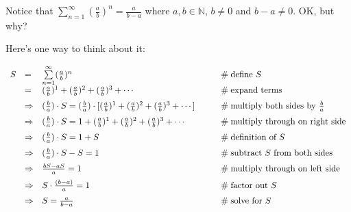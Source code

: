 \documentclass[11pt, oneside]{article}   	%
\begin{document}
\noindent
Notice that  $\sum\limits_{n = 1}^\infty (\frac{a}{b})^n  = \frac{a}{b - a}$ where $a,b \in \mathbb{N}$, $b \neq 0$ and $b - a \neq 0$. OK, but why?

\bigskip
\noindent
 Here's one way to think about it:  
      
\begin{equation*}
\begin{array}{lllll}
S
&=& \sum\limits_{n = 1}^\infty (\frac{a}{b})^n                                                                                                                &\qquad  \mathrel{\#} \text{define $S$}                                          \\ 
\vspace{2.0mm}
&=& (\frac{a}{b})^1 + (\frac{a}{b})^2 + (\frac{a}{b})^3 + \cdots                                                                                      &\qquad  \mathrel{\#} \text{expand terms}                                      \\
\vspace{2.0mm}
&\Rightarrow& (\frac{b}{a}) \cdot S = (\frac{b}{a}) \cdot [(\frac{a}{b})^1 + (\frac{a}{b})^2 + (\frac{a}{b})^3 + \cdots ]   &\qquad  \mathrel{\#} \text{multiply both sides by $\frac{b}{a}$}     \\
\vspace{2.0mm}
&\Rightarrow&  (\frac{b}{a}) \cdot S = 1 +(\frac{a}{b})^1 + (\frac{a}{b})^2 + (\frac{a}{b})^3 + \cdots                            &\qquad  \mathrel{\#} \text{multiply through on right side}              \\
\vspace{2.0mm}
&\Rightarrow&  (\frac{b}{a}) \cdot S = 1 + S                                                                                                                &\qquad  \mathrel{\#} \text{definition of $S$}                                   \\
\vspace{2.0mm}
&\Rightarrow&  (\frac{b}{a}) \cdot S - S = 1                                                                                                                 &\qquad  \mathrel{\#} \text{subtract $S$ from both sides}               \\
\vspace{2.0mm}
&\Rightarrow& \frac{bS - aS}{a} = 1                                                                                                                            &\qquad  \mathrel{\#} \text{multiply through on left side}                 \\
\vspace{2.0mm}
&\Rightarrow& S \cdot \frac{(b - a)} {a} = 1                                                                                                                 &\qquad  \mathrel{\#} \text{factor out $S$}                                       \\
\vspace{2.0mm}
&\Rightarrow& S  = \frac{a}{b - a}                                                                                                                               &\qquad  \mathrel{\#} \text{solve for $S$}
\end{array}
\end{equation*}
\end{document}
